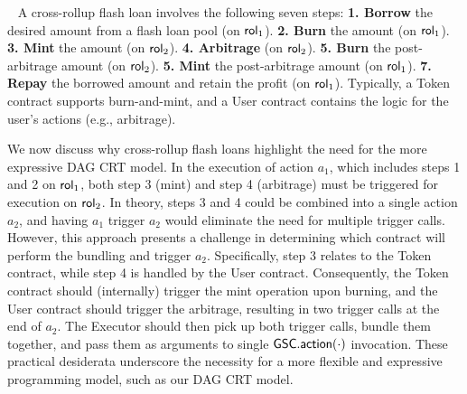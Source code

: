 ~\label{subsec:application-xfl}
A cross-rollup flash loan involves the following seven steps:
\noindent\textbf{1. Borrow} the desired amount from a flash loan pool (on $\mathsf{rol}_{1}$).
\noindent\textbf{2. Burn} the amount (on $\mathsf{rol}_{1}$).
\noindent\textbf{3. Mint} the amount (on $\mathsf{rol}_{2}$).
\noindent\textbf{4. Arbitrage} (on $\mathsf{rol}_{2}$). 
\noindent\textbf{5. Burn} the post-arbitrage amount (on $\mathsf{rol}_{2}$).
\noindent\textbf{5. Mint} the post-arbitrage amount (on $\mathsf{rol}_{1}$).
\noindent\textbf{7. Repay} the borrowed amount and retain the profit (on $\mathsf{rol}_{1}$). Typically, a Token contract supports burn-and-mint, and a User contract contains the logic for the user’s actions (e.g., arbitrage).

We now discuss why cross-rollup flash loans highlight the need for the more expressive DAG CRT model. In the execution of action $a_1$, which includes steps 1 and 2 on $\mathsf{rol}_{1}$, both step 3 (mint) and step 4 (arbitrage) must be triggered for execution on $\mathsf{rol}_{2}$. In theory, steps 3 and 4 could be combined into a single action $a_2$, and having $a_1$ trigger $a_2$ would eliminate the need for multiple trigger calls. However, this approach presents a challenge in determining which contract will perform the bundling and trigger $a_2$. Specifically, step 3 relates to the Token contract, while step 4 is handled by the User contract. Consequently, the Token contract should (internally) trigger the mint operation upon burning, and the User contract should trigger the arbitrage, resulting in two trigger calls at the end of $a_2$. The Executor should then pick up both trigger calls, bundle them together, and pass them as arguments to single $\mathsf{GSC}.\mathsf{action}(\cdot)$ invocation. These practical desiderata underscore the necessity for a more flexible and expressive programming model, such as our DAG CRT model.










